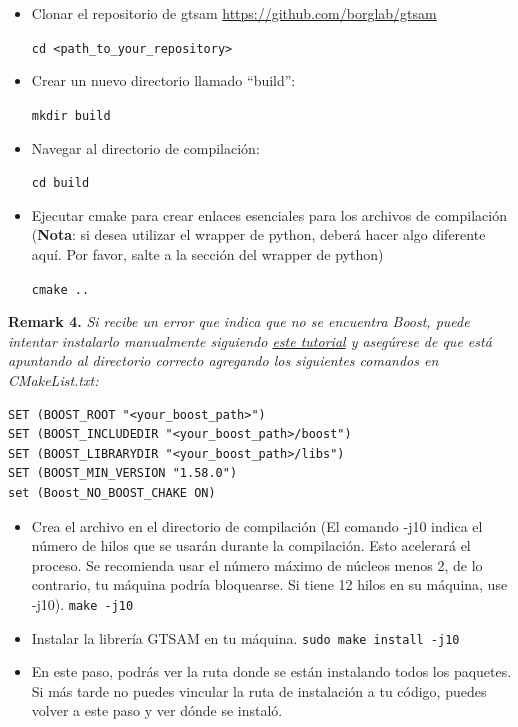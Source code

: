 \documentclass[tp]{lcc}
\begin{document}
\begin{itemize}
    \item Clonar el repositorio de gtsam \url{https://github.com/borglab/gtsam}
    
    \lstinline[style=bash]{cd <path_to_your_repository>}
    
    \item Crear un nuevo directorio llamado ``build'':
    
    \lstinline[style=bash]{mkdir build}
    
    \item Navegar al directorio de compilación:
    
    \lstinline[style=bash]{cd build}

    \item Ejecutar cmake para crear enlaces esenciales para los archivos de compilación (\textbf{Nota}: si desea utilizar el wrapper de python, deberá hacer algo diferente aquí. Por favor, salte a la sección del wrapper de python)

    \lstinline[style=bash]{cmake ..}
\end{itemize}

\textbf{Remark 4.} \textit{Si recibe un error que indica que no se encuentra Boost, puede intentar instalarlo manualmente siguiendo \href{https://www.boost.org/doc/libs/1_66_0/more/getting_started/unix-variants.html\#get-boost}{este tutorial} y asegúrese de que está apuntando al directorio correcto agregando los siguientes comandos en CMakeList.txt:}

\begin{lstlisting}[style=bash]
SET (BOOST_ROOT "<your_boost_path>")
SET (BOOST_INCLUDEDIR "<your_boost_path>/boost")
SET (BOOST_LIBRARYDIR "<your_boost_path>/libs")
SET (BOOST_MIN_VERSION "1.58.0")
set (Boost_NO_BOOST_CHAKE ON)
\end{lstlisting}

\begin{itemize}
    \item Crea el archivo en el directorio de compilación (El comando -j10 indica el número de hilos que se usarán durante la compilación. Esto acelerará el proceso. Se recomienda usar el número máximo de núcleos menos 2, de lo contrario, tu máquina podría bloquearse. Si tiene 12 hilos en su máquina, use -j10). \lstinline[style=bash]{make -j10}
    \item Instalar la librería GTSAM en tu máquina. \lstinline[style=bash]{sudo make install -j10}
    \item En este paso, podrás ver la ruta donde se están instalando todos los paquetes. Si más tarde no puedes vincular la ruta de instalación a tu código, puedes volver a este paso y ver dónde se instaló.
\end{itemize}
\end{document}
